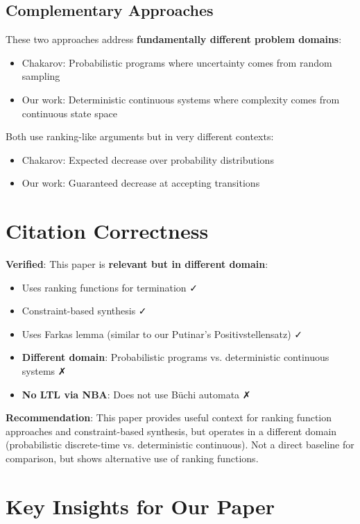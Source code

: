 \documentclass{article}
\begin{document}
\subsection{Complementary Approaches}

These two approaches address \textbf{fundamentally different problem domains}:
\begin{itemize}
    \item Chakarov: Probabilistic programs where uncertainty comes from random sampling
    \item Our work: Deterministic continuous systems where complexity comes from continuous state space
\end{itemize}

Both use ranking-like arguments but in very different contexts:
\begin{itemize}
    \item Chakarov: Expected decrease over probability distributions
    \item Our work: Guaranteed decrease at accepting transitions
\end{itemize}

\section{Citation Correctness}

\textbf{Verified}: This paper is \textbf{relevant but in different domain}:
\begin{itemize}
    \item Uses ranking functions for termination ✓
    \item Constraint-based synthesis ✓
    \item Uses Farkas lemma (similar to our Putinar's Positivstellensatz) ✓
    \item \textbf{Different domain}: Probabilistic programs vs. deterministic continuous systems ✗
    \item \textbf{No LTL via NBA}: Does not use Büchi automata ✗
\end{itemize}

\textbf{Recommendation}: This paper provides useful context for ranking function approaches and constraint-based synthesis, but operates in a different domain (probabilistic discrete-time vs. deterministic continuous). Not a direct baseline for comparison, but shows alternative use of ranking functions.

\section{Key Insights for Our Paper}
\end{document}
